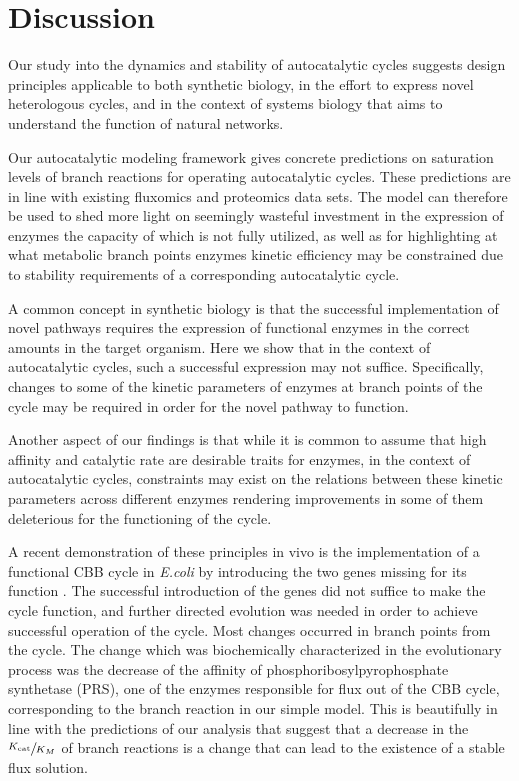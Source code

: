 \section{Discussion}
Our study into the dynamics and stability of autocatalytic cycles suggests design principles applicable to both synthetic biology, in the effort to express novel heterologous cycles, and in the context of systems biology that aims to understand the function of natural networks.

Our autocatalytic modeling framework gives concrete predictions on saturation levels of branch reactions for operating autocatalytic cycles.
These predictions are in line with existing fluxomics and proteomics data sets.
    The model can therefore be used to shed more light on seemingly wasteful investment in the expression of enzymes the capacity of which is not fully utilized, as well as for highlighting at what metabolic branch points enzymes kinetic efficiency may be constrained due to stability requirements of a corresponding autocatalytic cycle.

A common concept in synthetic biology is that the successful implementation of novel pathways requires the expression of functional enzymes in the correct amounts in the target organism.
Here we show that in the context of autocatalytic cycles, such a successful expression may not suffice.
Specifically, changes to some of the kinetic parameters of enzymes at branch points of the cycle may be required in order for the novel pathway to function.

Another aspect of our findings is that while it is common to assume that high affinity and catalytic rate are desirable traits for enzymes, in the context of autocatalytic cycles, constraints may exist on the relations between these kinetic parameters across different enzymes rendering improvements in some of them deleterious for the functioning of the cycle.

A recent demonstration of these principles in vivo is the implementation of a functional CBB cycle in \emph{E.coli} by introducing the two genes missing for its function \cite{Antonovsky2016-jy}.
The successful introduction of the genes did not suffice to make the cycle function, and further directed evolution was needed in order to achieve successful operation of the cycle.
Most changes occurred in branch points from the cycle.
The change which was biochemically characterized in the evolutionary process was the decrease of the affinity of phosphoribosylpyrophosphate synthetase (PRS), one of the enzymes responsible for flux out of the CBB cycle, corresponding to the branch reaction in our simple model.
This is beautifully in line with the predictions of our analysis that suggest that a decrease in the $\sfrac{K_{\text{cat}}}{K_M}$ of branch reactions is a change that can lead to the existence of a stable flux solution.

